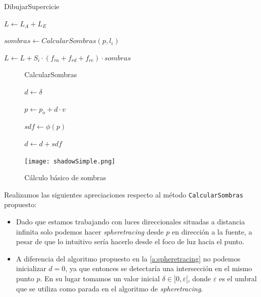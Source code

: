 \begin{algorithm}[H]
        \caption{DibujarSupercicie}
            $L \gets L_A + L_E$ 
             {

                $sombras \gets CalcularSombras(p, l_i)$

                $L \gets L + S_i\cdot (f_{ra} + f_{rd} + f_{re})\cdot sombras$
            }

    \end{algorithm}
\begin{figure}[ht!]
    \centering
    \begin{minipage}{0.50\textwidth}
   \begin{algorithm}[H]
            \caption{CalcularSombras}
                 $d \gets \delta$ 
                
                 {
                    $p \gets p_o + d \cdot v$
                    
                    $sdf \gets \phi(p)$
                    
            
                    $d \gets d + sdf$

                }

        \end{algorithm}
    \end{minipage}%
    \hfill
    \begin{minipage}{0.48\textwidth}
        \texttt{[image: shadowSimple.png]}
    \end{minipage}
    \caption{Cálculo básico de sombras}
    \label{fig:sombras1}
\end{figure}


Realizamos las siguientes apreciaciones respecto al método \texttt{CalcularSombras} propuesto:
\begin{itemize}
    \item Dado que estamos trabajando con luces direccionales situadas a distancia infinita solo podemos hacer \textit{spheretracing} desde $p$ en dirección a la fuente, a pesar de que lo intuitivo sería hacerlo desde el foco de luz hacia el punto.
    \item A diferencia del algoritmo propuesto en la \autoref{a:spheretracing} no podemos inicializar $d=0$, ya que entonces se detectaría una intersección en el mismo punto $p$. En su lugar tomamos un valor inicial  $\delta \in ]0, \varepsilon[$, donde $\varepsilon$ es el umbral que se utiliza como parada en el algoritmo de \textit{spheretracing}.
\end{itemize}

